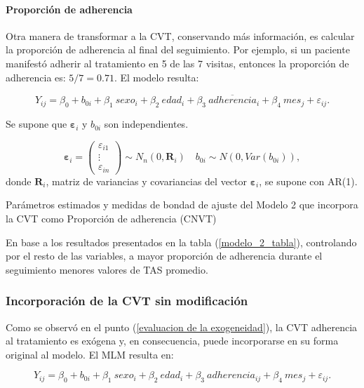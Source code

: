 \documentclass[spanish]{article}
\numberwithin{figure}{subsection}
\numberwithin{equation}{subsection}
\numberwithin{table}{subsection}
\begin{document}
\paragraph{Proporción de adherencia} \mbox{}

Otra manera de transformar a la CVT, conservando más información, es calcular la
proporción de adherencia al final del seguimiento. Por ejemplo, si un paciente
manifestó adherir al tratamiento en 5 de las 7 visitas, entonces la proporción
de adherencia es: $5/7= 0.71$. El modelo resulta:

\begin{equation}
	\label{modelo_2}
	Y_{ij} = \beta_0 + b_{0i} + \beta_1\ sexo_i + \beta_2\ edad_i + \beta_3\ \overline{adherencia}_i
	+ \beta_4\ mes_j + \varepsilon_{ij}.
\end{equation}

Se supone que $\bm{\varepsilon}_i$ y $b_{0i}$ son independientes.

\[ 
	\bm{\varepsilon}_i = \begin{pmatrix} \varepsilon_{i1} \\ \vdots \\ \varepsilon_{in} \end{pmatrix} \sim N_{n}(0, \bm{R}_i)
	\quad
	b_{0i} \sim N(0, Var(b_{0i})),
\]
donde $\bm{R}_i$, matriz de variancias y covariancias del vector
$\bm{\varepsilon}_{i}$, se supone con AR(1).

\begin{table}[H]
	\centering
	\caption{Parámetros estimados y medidas de bondad de ajuste del Modelo 2 que incorpora la CVT como Proporción de adherencia (CNVT)}
	\label{modelo_2_tabla}
	
\end{table}

En base a los resultados presentados en la tabla (\ref{modelo_2_tabla}),
controlando por el resto de las variables, a mayor proporción de adherencia
durante el seguimiento menores valores de TAS promedio.

\subsubsection{Incorporación de la CVT sin modificación}

Como se observó en el punto (\ref{evaluacion de la exogeneidad}), la CVT
adherencia al tratamiento es exógena y, en consecuencia, puede incorporarse en
su forma original al modelo. El MLM resulta en:

\begin{equation}
	\label{modelo_3}
	Y_{ij} = \beta_0 + b_{0i} + \beta_1\ sexo_i + \beta_2\ edad_i + \beta_3\ adherencia_{ij}
	+ \beta_4\ mes_j + \varepsilon_{ij}.
\end{equation}
\end{document}
